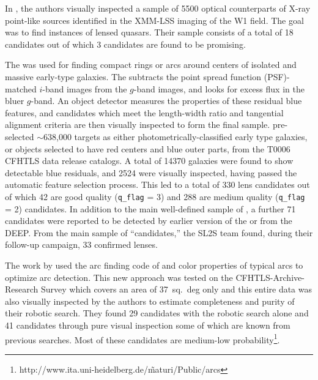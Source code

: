 \documentclass[useAMS,usenatbib,a4paper]{mn2e}
\begin{document}
In \citet{Elyiv2013}, the authors visually inspected a sample of 5500 optical
counterparts of X-ray point-like sources identified in the XMM-LSS
imaging of the \cfhtls W1 field. The goal was to find instances
of lensed quasars. Their sample consists of a total of 18 candidates out
of which 3 candidates are found to be promising.

The \rf \citep{Gavazzi2014} was used for finding compact rings or arcs
around centers of isolated and massive early-type galaxies. The \rf
subtracts the point spread function (PSF)-matched $i$-band images from the $g$-band images, and
looks for excess flux in the bluer $g$-band. An object detector measures
the properties of these residual blue features, and candidates which
meet the length-width ratio and tangential alignment criteria are then
visually inspected to form the final sample. \citet{Gavazzi2014}
pre-selected $\sim$638,000 targets as either photometrically-classified
early type galaxies, or objects selected to have red centers and blue
outer parts, from the T0006 CFHTLS data release catalogs. A total of
14370 galaxies were found to show detectable blue residuals, and 2524
were visually inspected, having passed the automatic feature selection
process. This led to a total of 330 lens candidates out of which 42 are
good quality (\texttt{q\_flag} = 3) and 288 are medium quality
(\texttt{q\_flag} = 2) candidates. In addition to the main well-defined
sample of \citet{Gavazzi2014}, a further 71 candidates were reported to
be detected by earlier version of the \rf or from the \cfhtls DEEP.
From the main sample of ``\rf candidates,'' the SL2S team found, during
their follow-up campaign, 33 confirmed lenses.

The work by \citet{Maturi2014} used the arc finding code of
\citet{Seidel2007} and color properties of typical arcs to optimize arc
detection. This new approach was tested on the CFHTLS-Archive-Research
Survey \citep[CARS,][]{Erben2009} which covers an area of 37~sq.~deg
only and this entire data was also visually inspected by the authors to
estimate completeness and purity of their robotic search. They found 29
candidates with the robotic search alone and 41 candidates through pure
visual inspection some of which are known from previous searches. Most
of these candidates are medium-low
probability\footnote{http://www.ita.uni-heidelberg.de/\~maturi/Public/arcs}.
\end{document}
